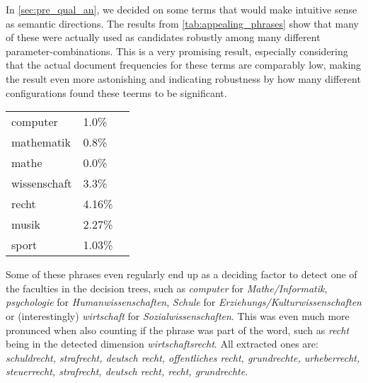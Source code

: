 In \autoref{sec:pre_qual_an}, we decided on some terms that would make intuitive sense as semantic directions. The results from \autoref{tab:appealing_phrases} show that many of these were actually used as candidates robustly among many different parameter-combinations. This is a very promising result, especially considering that the actual document frequencies for these terms are comparably low, making the result even more astonishing and indicating robustness by how many different configurations found these teerms to be significant. \\

\vspace{-3ex}

\begingroup
\renewcommand{\arraystretch}{0.75}
\begin{tabular}{lll}
    computer     & 1.0\% \\
    mathematik   & 0.8\% \\
    mathe        & 0.0\% \\
    wissenschaft & 3.3\% \\
    recht        & 4.16\% \\
    musik        & 2.27\% \\
    sport        & 1.03\% 
\end{tabular}
\endgroup
\vspace{0.5ex}

Some of these phrases even regularly end up as a deciding factor to detect one of the faculties in the decision trees, such as \textit{computer} for \textit{Mathe/Informatik}, \textit{psychologie} for \textit{Humanwissenschaften}, \textit{Schule} for \textit{Erziehungs/Kulturwissenschaften} or (interestingly) \textit{wirtschaft} for \textit{Sozialwissenschaften}. This was even much more pronunced when also counting if the phrase was part of the word, such as \textit{recht} being in the detected dimension \textit{wirtschaftsrecht}. All extracted ones are: \textit{schuldrecht, strafrecht, deutsch recht, offentliches recht, grundrechte, urheberrecht, steuerrecht, strafrecht, deutsch recht, recht, grundrechte}.


